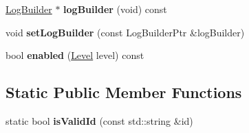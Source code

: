 \begin{DoxyCompactItemize}
\item 
\mbox{\label{classel_1_1_logger_ac7d79707cdbcb0851913d1e07338bc13}} 
\hyperlink{classel_1_1_log_builder}{Log\+Builder} $\ast$ {\bfseries log\+Builder} (void) const
\item 
\mbox{\label{classel_1_1_logger_a737340322cc9d9d20febd7131c1e262f}} 
void {\bfseries set\+Log\+Builder} (const Log\+Builder\+Ptr \&log\+Builder)
\item 
\mbox{\label{classel_1_1_logger_aa577392f6bd9f3a48b447fc0c7e5f8dc}} 
bool {\bfseries enabled} (\hyperlink{namespaceel_ab0ac6091262344c52dd2d3ad099e8e36}{Level} level) const
\end{DoxyCompactItemize}
\subsection*{Static Public Member Functions}
\begin{DoxyCompactItemize}
\item 
\mbox{\label{classel_1_1_logger_af6cf4f266ceb65da9563afd3706f26d6}} 
static bool {\bfseries is\+Valid\+Id} (const std\+::string \&id)
\end{DoxyCompactItemize}
